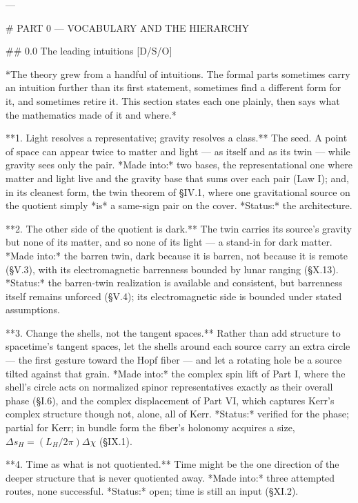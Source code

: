 ---

# PART 0 — VOCABULARY AND THE HIERARCHY

## 0.0 The leading intuitions [D/S/O]

*The theory grew from a handful of intuitions. The formal parts sometimes carry an intuition further than its first statement, sometimes find a different form for it, and sometimes retire it. This section states each one plainly, then says what the mathematics made of it and where.*

**1. Light resolves a representative; gravity resolves a class.** The seed. A point of space can appear twice to matter and light — as itself and as its twin — while gravity sees only the pair. *Made into:* two bases, the representational one where matter and light live and the gravity base that sums over each pair (Law I); and, in its cleanest form, the twin theorem of §IV.1, where one gravitational source on the quotient simply *is* a same-sign pair on the cover. *Status:* the architecture.

**2. The other side of the quotient is dark.** The twin carries its source's gravity but none of its matter, and so none of its light — a stand-in for dark matter. *Made into:* the barren twin, dark because it is barren, not because it is remote (§V.3), with its electromagnetic barrenness bounded by lunar ranging (§X.13). *Status:* the barren-twin realization is available and consistent, but barrenness itself remains unforced (§V.4); its electromagnetic side is bounded under stated assumptions.

**3. Change the shells, not the tangent spaces.** Rather than add structure to spacetime's tangent spaces, let the shells around each source carry an extra circle — the first gesture toward the Hopf fiber — and let a rotating hole be a source tilted against that grain. *Made into:* the complex spin lift of Part I, where the shell's circle acts on normalized spinor representatives exactly as their overall phase (§I.6), and the complex displacement of Part VI, which captures Kerr's complex structure though not, alone, all of Kerr. *Status:* verified for the phase; partial for Kerr; in bundle form the fiber's holonomy acquires a size, $\Delta s_H = (L_H/2\pi)\Delta\chi$ (§IX.1).

**4. Time as what is not quotiented.** Time might be the one direction of the deeper structure that is never quotiented away. *Made into:* three attempted routes, none successful. *Status:* open; time is still an input (§XI.2).

